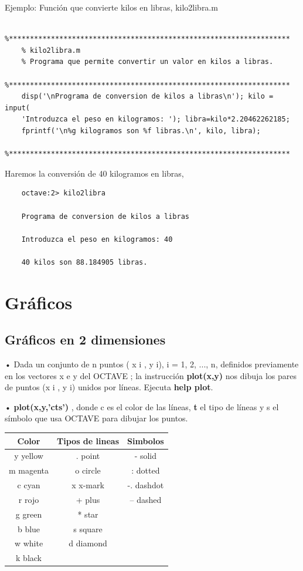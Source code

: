 \documentclass[a4,12pt]{article}
\begin{document}
Ejemplo: Función que convierte kilos en libras, kilo2libra.m
\begin{verbatim}
    %*******************************************************************
    % kilo2libra.m
    % Programa que permite convertir un valor en kilos a libras.
    %*******************************************************************
    disp('\nPrograma de conversion de kilos a libras\n'); kilo = input(
    'Introduzca el peso en kilogramos: '); libra=kilo*2.20462262185;
    fprintf('\n%g kilogramos son %f libras.\n', kilo, libra);
    %*******************************************************************
\end{verbatim}
Haremos la conversión de 40 kilogramos en libras,
\begin{verbatim}
    octave:2> kilo2libra

    Programa de conversion de kilos a libras

    Introduzca el peso en kilogramos: 40

    40 kilos son 88.184905 libras.
\end{verbatim}

\section{Gráficos}

\subsection{Gráficos en 2 dimensiones}

• Dada un conjunto de n puntos ( x i , y i), i = 1, 2, ..., n, definidos previamente en los vectores x e y del OCTAVE ; la instrucción \textbf{plot(x,y)} nos dibuja los pares de puntos (x i , y i) unidos por líneas. Ejecuta \textbf{help plot}.

• \textbf{plot(x,y,’cts’)} , donde c es el color de las líneas, \textbf{t} el tipo de líneas y s el símbolo que usa OCTAVE para dibujar los puntos.
\begin{center}
\begin{tabular}{|c|c|c|} \hline
\textbf{Color} &  \textbf{Tipos de lineas} & \textbf{Simbolos} \\ \hline
y yellow & . point & - solid \\ \hline
m magenta & o circle & : dotted \\ \hline
c cyan & x x-mark & -. dashdot \\ \hline
r rojo & + plus & – dashed \\ \hline
g green & * star &  \\ \hline
b blue & s square &  \\ \hline
w white & d diamond &  \\ \hline 
k black &  &  \\ \hline 
\end{tabular}
\end{center}
\end{document}
